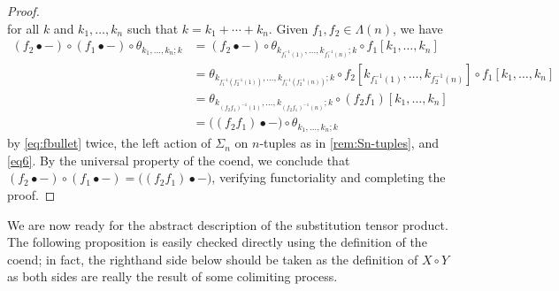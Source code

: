 \begin{proof}
\begin{equation}
\end{equation}
for all $k$ and $k_1, \ldots, k_n$ such that $k = k_1 + \cdots + k_n$.
Given $f_1, f_2 \in \Lambda(n)$, we have
\begin{align*}
(f_2 \bullet -) \circ (f_1 \bullet -) \circ \theta_{k_1, \ldots, k_n; k} & = (f_2 \bullet -) \circ \theta_{k_{f_1^{-1}(1)}, \ldots, k_{f_1^{-1}(n)}; k} \circ f_1[k_1, \ldots, k_n] \\
& = \theta_{k_{f_1^{-1}(f_2^{-1}(1))}, \ldots, k_{f_1^{-1}(f_2^{-1}(n))}; k} \circ f_2[k_{f_1^{-1}(1)}, \ldots, k_{f_2^{-1}(n)}] \circ f_1[k_1, \ldots, k_n] \\
& = \theta_{k_{(f_2f_1)^{-1}(1)}, \ldots, k_{(f_2f_1)^{-1}(n)};k} \circ (f_2f_1)[k_1, \ldots, k_n] \\
& = \big( (f_2f_1) \bullet -\big) \circ \theta_{k_1, \ldots, k_n; k}
\end{align*}
by \cref{eq:fbullet} twice, the left action of $\Sigma_n$ on $n$-tuples as in \cref{rem:Sn-tuples}, and \cref{eq6}.
By the universal property of the coend, we conclude that $(f_2 \bullet -) \circ (f_1 \bullet -) = \big( (f_2f_1) \bullet -\big)$, verifying functoriality and completing the proof.
\end{proof}


We are now ready for the abstract description of the substitution tensor product. The following proposition is easily checked directly using the definition of the coend; in fact, the righthand side below should be taken as the definition of $X \circ Y$ as both sides are really the result of some colimiting process.

